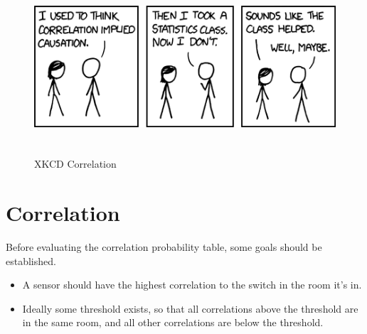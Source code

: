 \begin{figure}[htbp]
\centering
\includegraphics[width=459pt,height=185pt]{figures/correlation.png}
\caption{XKCD Correlation}
\label{correlation}
\end{figure}



\section{Correlation}
\label{correlation}

Before evaluating the correlation probability table, some goals should be established.

\begin{itemize}
\item A sensor should have the highest correlation to the switch in the room it's in.

\item Ideally some threshold exists, so that all correlations above the threshold are in the same room, and all other correlations are below the threshold.

\end{itemize}


